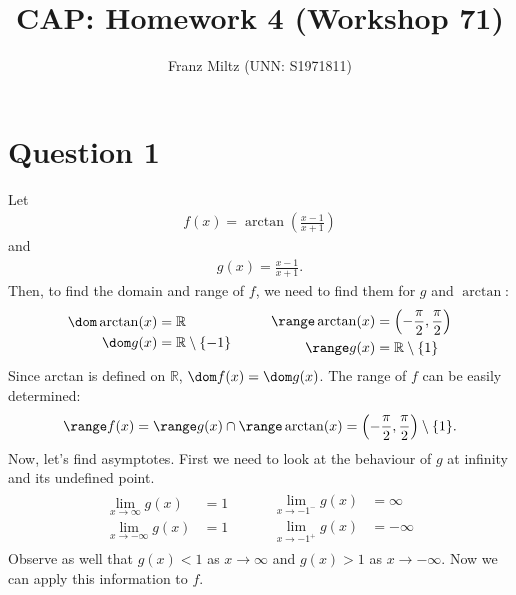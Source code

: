 \documentclass{article}
\title{CAP: Homework 4 (Workshop 71)}
\author{Franz Miltz (UNN: S1971811)}
\begin{document}
\maketitle
\section*{Question 1}
Let
\begin{align*}
  f(x) = \arctan\left(\frac{x-1}{x+1}\right)
\end{align*}
and
\begin{align*}
  g(x) = \frac{x-1}{x+1}.
\end{align*}
Then, to find the domain and range of $f$, we need to find them for $g$ and $\arctan$:
\begin{align*}
  \begin{aligned}
    \dom \arctan(x) & = \mathbb{R}                  \\
    \dom g(x)       & = \mathbb{R} \setminus \{-1\}
  \end{aligned}
  \hspace{1cm}
  \begin{aligned}
    \range \arctan(x) & = \left(-\frac{\pi}{2}, \frac{\pi}{2}\right) \\
    \range g(x)       & = \mathbb{R}\setminus\{1\}
  \end{aligned}
\end{align*}
Since arctan is defined on $\mathbb{R}$, $\dom f(x) = \dom g(x)$. The range of $f$ can be easily determined:
\begin{align*}
  \range f(x) = \range g(x) \cap \range \arctan(x) = \left(-\frac{\pi}{2}, \frac{\pi}{2}\right) \setminus \{1\}.
\end{align*}
Now, let's find asymptotes. First we need to look at the behaviour of $g$ at infinity and its undefined point.
\begin{align*}
  \begin{aligned}
    \lim_{x\to\infty}g(x)  & = 1 \\
    \lim_{x\to-\infty}g(x) & = 1
  \end{aligned}
  \hspace{1cm}
  \begin{aligned}
    \lim_{x\to-1^-}g(x) & =\infty  \\
    \lim_{x\to-1^+}g(x) & =-\infty
  \end{aligned}
\end{align*}
Observe as well that $g(x)<1$ as $x\to\infty$ and $g(x)>1$ as $x\to-\infty$. Now we can apply this information to $f$.
\end{document}
